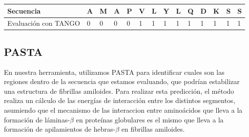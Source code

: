 \vspace{0.5cm}
\begin{center}
\begin{tabular}{llllllllllllll} 
\hline      		
Secuencia & \textbf{A} & \textbf{M} & \textbf{A} & \textbf{P} & \textbf{V} & \textbf{L} & \textbf{Y} & \textbf{L} & \textbf{Q} & \textbf{D} & \textbf{K} & \textbf{S} & \textbf{S} \\ \hline
Evaluación con TANGO & 0 & 0 & 0 & 0 & 1 & 1 & 1 & 1 & 1 & 1 & 1 & 1 & 1 \\ \hline
\end{tabular}
\end{center}





% 








\subsection{PASTA}\label{pasta}

En nuestra herramienta, utilizamos PASTA \cite{trovato2006insight} para identificar cuales son las regiones dentro de la secuencia que estamos evaluando, que podrían estabilizar una estructura de fibrillas amiloides.
Para realizar esta predicción, el método realiza un cálculo de las energías de interacción entre los distintos segmentos, asumiendo que el mecanismo de las interaccion entre aminoácidos que lleva a la formación 
de láminas-$\beta$ en proteínas globulares es el mismo que lleva a la formación de apilamientos de hebras-$\beta$ en fibrillas amiloides.

